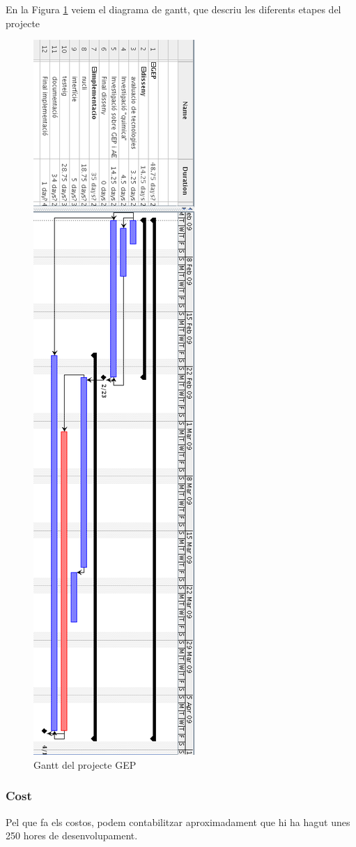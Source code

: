 En la Figura \ref{fig:gep-gantt} veiem el diagrama de gantt, que descriu les
diferents etapes del projecte 

\begin{figure}[h]
	\begin{center}
		\includegraphics[scale=0.5]{gep-gantt.png}
	\end{center}
	\caption{Gantt del projecte GEP}
	\label{fig:gep-gantt}
\end{figure}

\subsubsection{Cost} %
\label{ssub:Cost}

Pel que fa els costos, podem contabilitzar aproximadament que hi ha hagut unes
250 hores de desenvolupament.

%
